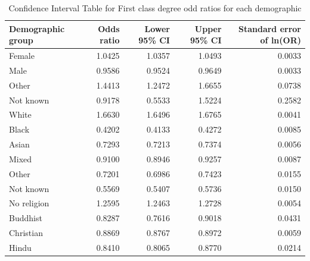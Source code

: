 \documentclass[11pt,a4paper]{article}
\begin{document}
\begin{table}[t]
    \caption{Confidence Interval Table for First class degree odd ratios for each demographic}
    \label{tab:demographic_OR_CI}
\begin{center}
\begin{tabular}{lrrrr}
\toprule
                    Demographic group &  Odds ratio &  Lower 95\% CI &  Upper 95\% CI &  Standard error of ln(OR)\\
\midrule
                      Female &      1.0425 &              1.0357 &              1.0493 &          0.0033 \\
                        Male &      0.9586 &              0.9524 &              0.9649 &          0.0033 \\
                       Other &      1.4413 &              1.2472 &              1.6655 &          0.0738 \\
                   Not known &      0.9178 &              0.5533 &              1.5224 &          0.2582 \\
\midrule                   
                       White &      1.6630 &              1.6496 &              1.6765 &          0.0041 \\
                       Black &      0.4202 &              0.4133 &              0.4272 &          0.0085 \\
                       Asian &      0.7293 &              0.7213 &              0.7374 &          0.0056 \\
                       Mixed &      0.9100 &              0.8946 &              0.9257 &          0.0087 \\
                       Other &      0.7201 &              0.6986 &              0.7423 &          0.0155 \\
                   Not known &      0.5569 &              0.5407 &              0.5736 &          0.0150 \\
\midrule                   
                 No religion &      1.2595 &              1.2463 &              1.2728 &          0.0054 \\
                    Buddhist &      0.8287 &              0.7616 &              0.9018 &          0.0431 \\
                   Christian &      0.8869 &              0.8767 &              0.8972 &          0.0059 \\
                       Hindu &      0.8410 &              0.8065 &              0.8770 &          0.0214 \\

\end{tabular}
\end{center}
\end{table}
\end{document}
